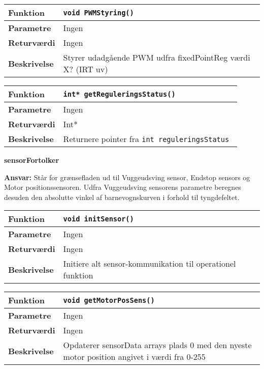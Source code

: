 \begin{center}
    \begin{tabular}{ | l | p{} |}
    \hline
    \textbf{Funktion}	& \verb+void PWMStyring() +				\\ \hline
    \textbf{Parametre} 	& Ingen 		\\ \hline
    \textbf{Returværdi}	& Ingen														\\ \hline
    \textbf{Beskrivelse}	& Styrer udadgående PWM udfra fixedPointReg værdi X? (IRT uv)	\\ \hline
    \end{tabular}
\end{center}


\begin{center}
    \begin{tabular}{ | l | p{} |}
    \hline
    \textbf{Funktion}	& \verb+int* getReguleringsStatus() +				\\ \hline
    \textbf{Parametre} 	& Ingen 		\\ \hline
    \textbf{Returværdi}	& Int*														\\ \hline
    \textbf{Beskrivelse}	& Returnere pointer fra \verb+int reguleringsStatus + 	\\ \hline
    \end{tabular}
\end{center}

{\centering
\textbf{sensorFortolker}\par
}
\textbf{Ansvar:} Står for grænsefladen ud til Vuggeudsving sensor, Endstop sensors og Motor positionssensoren. Udfra Vuggeudsving sensorens parametre beregnes desuden den absolutte vinkel af barnevognskurven i forhold til tyngdefeltet. \

\begin{center}
    \begin{tabular}{ | l | p{} |}
    \hline
    \textbf{Funktion}	& \verb+void initSensor() +				\\ \hline
    \textbf{Parametre} 	& Ingen							 		\\ \hline
    \textbf{Returværdi}	& Ingen									\\ \hline
    \textbf{Beskrivelse}	& Initiere alt sensor-kommunikation til operationel funktion	\\ \hline
    \end{tabular}
\end{center}

\begin{center}
    \begin{tabular}{ | l | p{} |}
    \hline
    \textbf{Funktion}	& \verb+void getMotorPosSens() +				\\ \hline
    \textbf{Parametre} 	& Ingen							 		\\ \hline
    \textbf{Returværdi}	& Ingen									\\ \hline
    \textbf{Beskrivelse}	& Opdaterer sensorData arrays plads 0 med den nyeste motor position angivet i værdi fra 0-255	\\ \hline
    \end{tabular}
\end{center}

